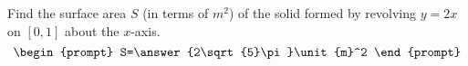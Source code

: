 \documentclass{ximera}
\author{Gregory Hartman \and Matthew Carr}
\begin{document}
\begin{exercise}





Find the surface area $S$ (in terms of $\unit{m}^2$) of the solid formed by revolving $y=2x$ on $[0,1]$ about the $x$-axis.
\[
\begin{prompt}
S=\answer{2\sqrt{5}\pi}\unit{m}^2
\end{prompt}
\]


\end{exercise}
\end{document}

